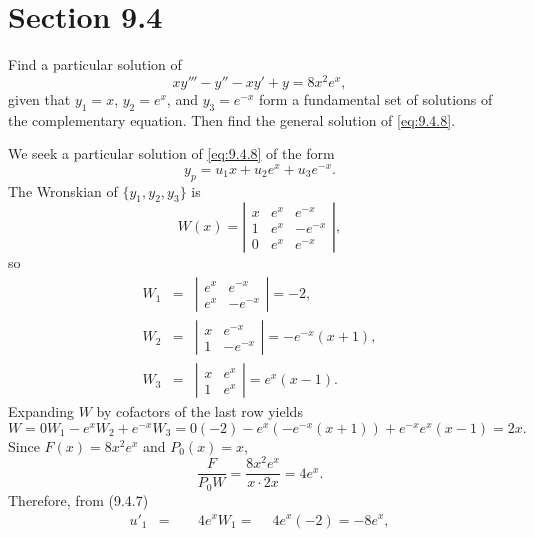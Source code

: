\section*{Section 9.4}
\setcounter{chapter}{9}
\setcounter{section}{4}

\setcounter{example}{0}
\setcounter{equation}{7}
\begin{example}
  \label{example:9.4.1} \rm Find a particular solution of
  \begin{equation}
    \label{eq:9.4.8}xy'''-y''-xy'+y=8x^{2}e^{x},
  \end{equation}
  given that $y_{1}=x$, $y_{2}=e^{x}$, and $y_{3}=e^{-x}$ form a fundamental set of solutions of the
  complementary equation. Then find the general solution of \eqref{eq:9.4.8}.
\end{example}
\begin{examplesolution}
\solution We seek a particular solution of \eqref{eq:9.4.8} of the form
\[
  y_{p}=u_{1}x+u_{2}e^{x}+u_{3}e^{-x}.
\]
The Wronskian of $\{y_{1},y_{2},y_{3}\}$ is
\[
  W(x)=\left|
  \begin{array}{ccr}
    x & e^{x} & e^{-x}  \\
    1 & e^{x} & -e^{-x} \\
    0 & e^{x} & e^{-x}
  \end{array}\right|,
\]
so
\begin{eqnarray*}
  W_{1}&=& \left|
  \begin{array}{cr}
    e^{x} & e^{-x}  \\
    e^{x} & -e^{-x}
  \end{array}\right|=-2,\\[10pt] W_{2}&=& \left|
  \begin{array}{cr}
    x & e^{-x}  \\
    1 & -e^{-x}
  \end{array}\right|=-e^{-x}(x+1),\\ W_{3}&=& \left|
  \begin{array}{cc}
    x & e^{x} \\
    1 & e^{x}
  \end{array}\right|=e^{x}(x-1).
\end{eqnarray*}
Expanding $W$ by cofactors of the last row yields
\[
  W=0W_{1}-e^{x}W_{2}+e^{-x}W_{3}=0(-2)-e^{x}\left(-e^{-x}(x+1)\right) +e^{-x}e^{x}(x-1)=2x.
\]
Since $F(x)=8x^{2}e^{x}$ and $P_{0}(x)=x$,
\[
  \frac{F}{P_{0}W}=\frac{8x^{2}e^{x}}{x\cdot2x}=4e^{x}.
\]
Therefore, from \textup{(9.4.7)}
\begin{eqnarray*}
  u'_{1} & = & \phantom{-}4e^{x}W_{1}=\phantom{-}4e^{x}(-2)=-8e^{x}, \\

\end{eqnarray*}
\end{examplesolution}
